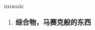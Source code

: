 
\begin{frame}
{\huge mosaic}
\begin{center}
\begin{enumerate}\Large
  \item \textbf{综合物，马赛克般的东西}
\end{enumerate}
\end{center}
\end{frame}

